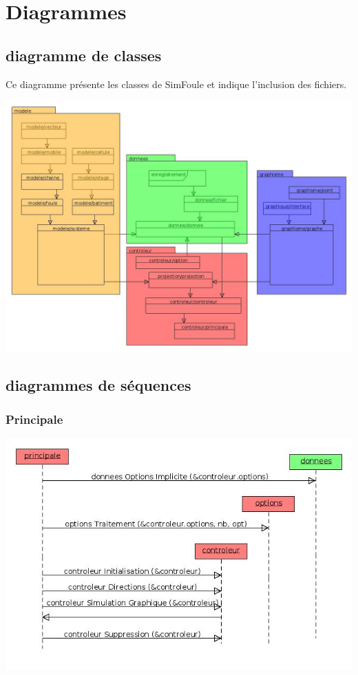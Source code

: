 %
\section{Diagrammes}
%
%
\subsection{diagramme de classes}
%
Ce diagramme présente les classes de SimFoule et indique l'inclusion des fichiers.
%
\begin{center}
\includegraphics[scale=0.45]{./illustration/classesSimFoule}
\end{center}
%
%
\subsection{diagrammes de séquences}
\newpage
%
\subsubsection{Principale}
\includegraphics[width=.95\textwidth]{./illustration/sequenceInitialisationPrincipale}

